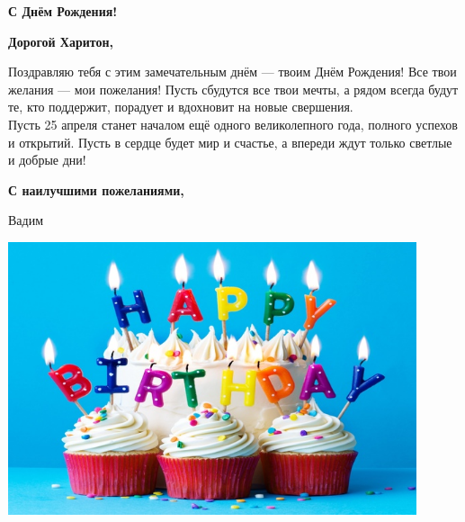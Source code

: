 \documentclass[10pt]{article}
\begin{document}
 

\thispagestyle{empty}

\begin{center}
    \textbf{\LARGE С Днём Рождения!}
\end{center}

\vspace{1cm}

{\bfseries Дорогой Харитон,}

Поздравляю тебя с этим замечательным днём --- твоим Днём Рождения! Все твои желания --- мои пожелания! Пусть сбудутся все твои мечты, а рядом всегда будут те, кто поддержит, порадует и вдохновит на новые свершения.\\

Пусть 25 апреля станет началом ещё одного великолепного года, полного успехов и открытий. Пусть в сердце будет мир и счастье, а впереди ждут только светлые и добрые дни!

{\bfseries С наилучшими пожеланиями, 

Вадим}

\vspace{1cm}

\begin{center}
    \includegraphics[width=0.9\textwidth]{birthday.jpg}
\end{center}
\end{document}
